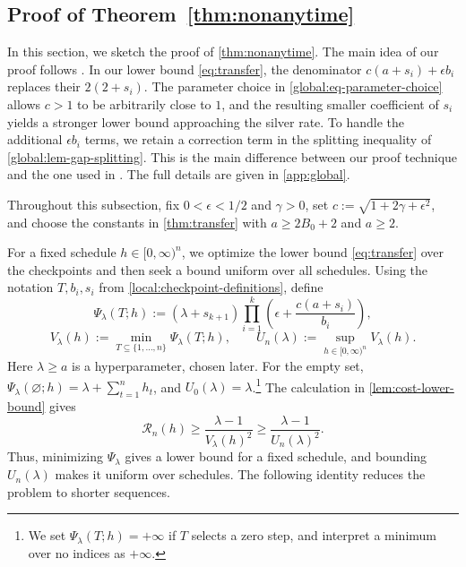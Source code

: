 \documentclass[11pt,letterpaper]{article}
\theoremstyle{definition}
\begin{document}
\begin{samepage}
\subsection{Proof of Theorem~\ref{thm:nonanytime}}
\label{sec:global}
\label{sec:silver}

In this section, we sketch the proof of \cref{thm:nonanytime}.
The main idea of our proof follows \citet[Section~3 and Appendix~C]{JungChoYun2026}.
In our lower bound \eqref{eq:transfer}, the denominator $c(a+s_i)+\epsilon b_i$ replaces their $2(2+s_i)$.
The parameter choice in \eqref{global:eq-parameter-choice} allows $c>1$ to be arbitrarily close to $1$, and the resulting smaller coefficient of $s_i$ yields a stronger lower bound approaching the silver rate.
To handle the additional $\epsilon b_i$ terms, we retain a correction term in the splitting inequality of \cref{global:lem-gap-splitting}. This is the main difference between our proof technique and the one used in \citet[Section~3]{JungChoYun2026}.
The full details are given in \cref{app:global}.
\par
\end{samepage}

Throughout this subsection, fix $0<\epsilon<1/2$ and $\gamma>0$, set $c:=\sqrt{1+2\gamma+\epsilon^2}$, and choose the constants in \cref{thm:transfer} with $a\ge2B_0+2$ and $a\ge2$.

For a fixed schedule $h\in[0,\infty)^n$, we optimize the lower bound \eqref{eq:transfer} over the checkpoints and then seek a bound uniform over all schedules.
Using the notation $T,b_i,s_i$ from \eqref{local:checkpoint-definitions}, define
\begin{equation}
  \Psi_\lambda(T;h):=(\lambda+s_{k+1})
  \prod_{i=1}^k\left(\epsilon+\frac{c(a+s_i)}{b_i}\right),
  \label{global:eq-checkpoint-expression}
\end{equation}
\begin{equation*}
  V_\lambda(h):=\min_{T\subseteq\{1,\ldots,n\}}\Psi_\lambda(T;h),
  \qquad
  U_n(\lambda):=\sup_{h\in[0,\infty)^n}V_\lambda(h).
\end{equation*}
Here $\lambda\ge a$ is a hyperparameter, chosen later.
For the empty set, $\Psi_\lambda(\varnothing;h)=\lambda+\sum_{t=1}^n h_t$, and $U_0(\lambda)=\lambda$.\footnote{We set $\Psi_\lambda(T;h)=+\infty$ if $T$ selects a zero step, and interpret a minimum over no indices as $+\infty$.}
The calculation in \cref{lem:cost-lower-bound} gives
\begin{equation}
  \mathcal R_n(h)\ge\frac{\lambda-1}{V_\lambda(h)^2}
  \ge\frac{\lambda-1}{U_n(\lambda)^2}.
  \label{global:eq-cost-lower-bound}
\end{equation}
Thus, minimizing $\Psi_\lambda$ gives a lower bound for a fixed schedule, and bounding $U_n(\lambda)$ makes it uniform over schedules.
The following identity reduces the problem to shorter sequences.
\end{document}
